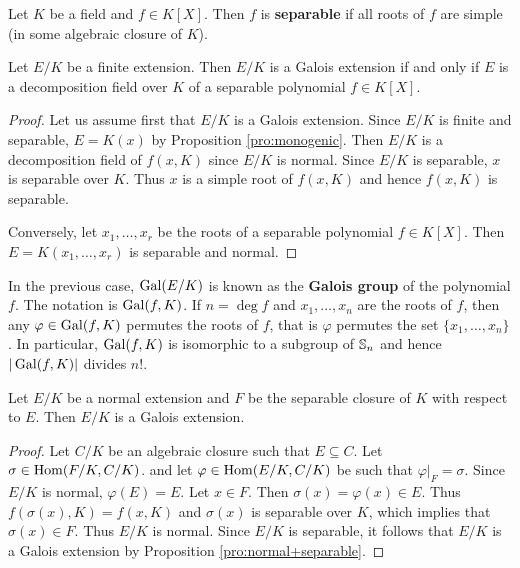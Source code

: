 \begin{definition}
Let $K$ be a field and $f\in K[X]$. Then $f$ is \textbf{separable}
if all roots of $f$ are simple (in some algebraic closure of $K$). 
\end{definition}

\begin{proposition}
    Let $E/K$ be a finite extension. Then $E/K$ is a Galois extension 
    if and only if $E$ is a decomposition field over $K$ 
    of a separable polynomial $f\in K[X]$. 
\end{proposition}

\begin{proof}
    Let us assume first that $E/K$ is a Galois extension. Since
    $E/K$ is finite and separable, $E=K(x)$ by Proposition \ref{pro:monogenic}. 
    Then $E/K$ is a decomposition field of $f(x,K)$ since
    $E/K$ is normal. Since $E/K$ is separable, $x$ is separable over $K$. Thus $x$ is 
    a simple root of $f(x,K)$ and hence $f(x,K)$ is separable. 
    
    Conversely, let $x_1,\dots,x_r$ be the roots of a separable polynomial $f\in K[X]$.
    Then $E=K(x_1,\dots,x_r)$ is separable and normal.  
\end{proof}

In the previous case, $\operatorname{Gal}(E/K)$ is known as the \textbf{Galois group}
of the polynomial $f$. The notation is $\operatorname{Gal}(f,K)$. If $n=\deg f$ and
$x_1,\dots,x_n$ are the roots of $f$, then any 
$\varphi\in\operatorname{Gal}(f,K)$ permutes the roots of $f$, that is
$\varphi$ permutes the 
set $\{x_1,\dots,x_n\}$. In particular, $\operatorname{Gal}(f,K)$ is isomorphic to a subgroup of
$\mathbb{S}_n$ and hence $|\operatorname{Gal}(f,K)|$ divides $n!$. 

\begin{proposition}
    Let $E/K$ be a normal extension and $F$ be the separable
    closure of $K$ with respect to $E$. 
    Then $E/K$ is a Galois extension.
\end{proposition}

\begin{proof} 
    Let $C/K$ be an algebraic closure such that $E\subseteq C$. Let $\sigma\in\operatorname{Hom}(F/K,C/K)$. 
    and let $\varphi\in\operatorname{Hom}(E/K,C/K)$ be such that $\varphi|_F=\sigma$. Since $E/K$ is normal, 
    $\varphi(E)=E$. Let $x\in F$. Then $\sigma(x)=\varphi(x)\in E$. Thus
    $f(\sigma(x),K)=f(x,K)$ and $\sigma(x)$ is separable over $K$, which 
    implies that $\sigma(x)\in F$. Thus $E/K$ is normal. Since $E/K$ is separable, it follows
    that $E/K$ is a Galois extension by Proposition \ref{pro:normal+separable}.
\end{proof}


